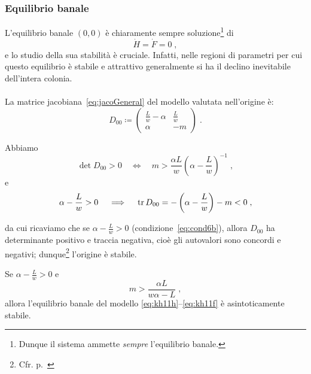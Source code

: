 \subsubsection{Equilibrio banale}
L'equilibrio banale $(0,0)$ è chiaramente sempre soluzione\footnote{Dunque il sistema ammette
\emph{sempre} l'equilibrio banale.}
di $$\dot{H}=\dot{F}=0 \; ,$$ e lo studio della sua stabilità è cruciale.
Infatti, nelle regioni di parametri per cui questo equilibrio è stabile e attrattivo generalmente si ha il declino
inevitabile dell'intera colonia.

\paragraph{}
La matrice jacobiana~\eqref{eq:jacoGeneral} del modello valutata nell'origine è:
\begin{equation}
    D_{00} \coloneq
    \begin{pmatrix}
        \frac{L}{w} -\alpha &
        \frac{L}{w}
        \\
        \alpha & -m
    \end{pmatrix} \; .
    \label{eq:jacoEquZero}
\end{equation}


Abbiamo
$$\det  D_{00} > 0 \quad \iff \quad
m > \frac{\alpha L}{w} {\left( \alpha - \frac{L}{w} \right)}^{-1} \; ,$$
e
$$ \alpha - \frac{L}{w} > 0  \quad \implies \quad
\operatorname{tr} D_{00} = - \left( \alpha - \frac{L}{w} \right) - m < 0 \; ,$$

da cui ricaviamo che se $\alpha -\frac{L}{w}>0$ (condizione~\eqref{eq:cond6b}), allora $D_{00}$ ha
determinante positivo e traccia negativa, cioè gli autovalori sono concordi e negativi;
dunque\footnote{Cfr. p.~\pageref{teo:pozzoNonLineare}} l'origine è stabile.

\begin{lemma}
    Se $\alpha - \frac{L}{w} > 0$ e
    $$m > \frac{\alpha L}{w \alpha -L} \; ,$$
    allora l'equilibrio banale del modello \eqref{eq:kh11h}--\eqref{eq:kh11f} è asintoticamente stabile.
\end{lemma}


